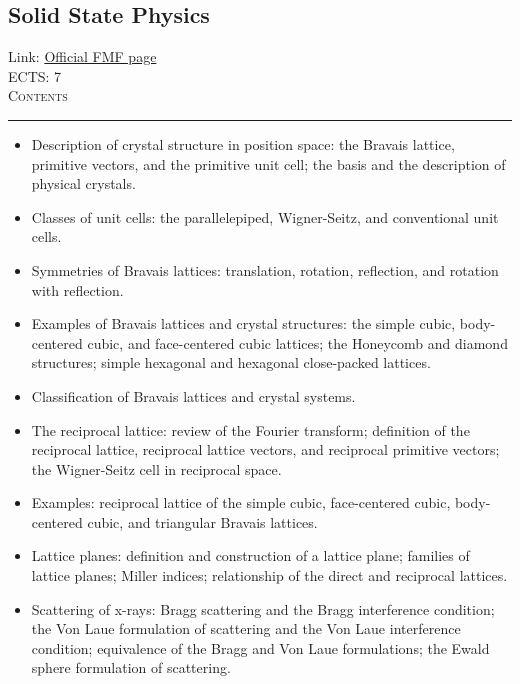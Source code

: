\documentclass[11pt, a4paper]{article}
\newenvironment{course}[3]{
\subsection{#1}%
Link: \href{#2}{Official FMF page}\\%
ECTS: #3%
\vspace{1ex}
\\
{\large \textsc{Contents}}\\[-0.9ex]%
\rule{\textwidth}{0.5pt}
\vspace{-3ex}
}
{}
\newenvironment{chapter}[1]{
\begin{tcolorbox}[title=#1, breakable]
}
{\end{tcolorbox}}
\begin{document}
\begin{course}{Solid State Physics}{https://www.fmf.uni-lj.si/en/study-physics/programmes/1fiz/2020/7000777/courses/1138/}{7}
    \label{solid-state-physics}
    \begin{chapter}{Crystal structure}
        \begin{itemize}
        
            \item Description of crystal structure in position space: the Bravais lattice, primitive vectors, and the primitive unit cell; the basis and the description of physical crystals.

            \item Classes of unit cells: the parallelepiped, Wigner-Seitz, and conventional unit cells.

            \item Symmetries of Bravais lattices: translation, rotation, reflection, and rotation with reflection.

            \item Examples of Bravais lattices and crystal structures: the simple cubic, body-centered cubic, and face-centered cubic lattices; the Honeycomb and diamond structures; simple hexagonal and hexagonal close-packed lattices.

            \item Classification of Bravais lattices and crystal systems.

            \item The reciprocal lattice: review of the Fourier transform; definition of the reciprocal lattice, reciprocal lattice vectors, and reciprocal primitive vectors; the Wigner-Seitz cell in reciprocal space.

            \item Examples: reciprocal lattice of the simple cubic, face-centered cubic, body-centered cubic, and triangular Bravais lattices.

            \item Lattice planes: definition and construction of a lattice plane; families of lattice planes; Miller indices; relationship of the direct and reciprocal lattices.

            \item Scattering of x-rays: Bragg scattering and the Bragg interference condition; the Von Laue formulation of scattering and the Von Laue interference condition; equivalence of the Bragg and Von Laue formulations; the Ewald sphere formulation of scattering.


\end{itemize}
\end{chapter}
\end{course}
\end{document}
